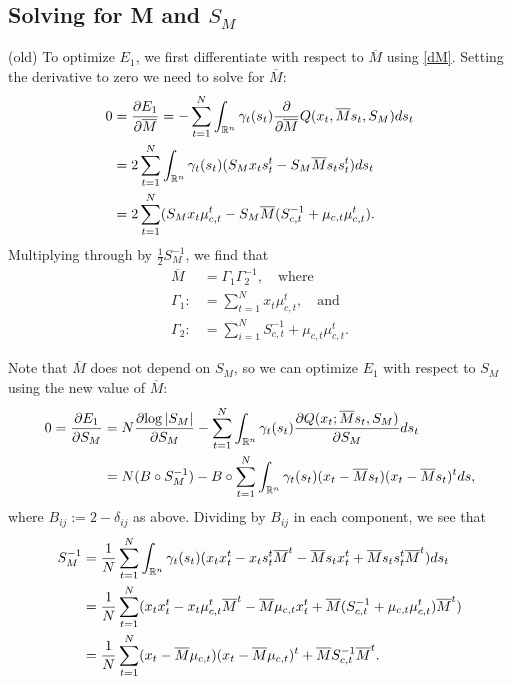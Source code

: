 \documentclass[12pt,leqno]{article}
\begin{document}
\subsection{Solving for M and $S_M$} (old)
To optimize $E_1$, we first differentiate with respect to $\overline{M}$ using \eqref{dM}.
Setting the derivative to zero we need to solve for $\overline{M}$:
\begin{align*}
  0 &= \frac{\partial{E_1}}{\partial\overline{M}}
  = -\sum_{t=1}^N\int_{{\mathbb R}^n}\gamma_t(s_t)\frac{\partial}{\partial\overline{M}}Q(x_t,\overline{M}s_t,S_M)ds_t\\
  &= 2\sum_{t=1}^N\int_{{\mathbb R}^n}\gamma_t(s_t)(S_Mx_ts_t^t - S_M\overline{M}s_ts_t^t)ds_t\\
  &= 2\sum_{t=1}^N(S_Mx_t\mu_{c,t}^t - S_M\overline{M}(S_{c,t}^{-1} + \mu_{c,t}\mu_{c,t}^t).
\end{align*}
Multiplying through by $\frac{1}{2}S_M^{-1}$, we find that
\begin{equation}\label{M_bar}
  \begin{split}
    \overline{M} &= \Gamma_1\Gamma_2^{-1}, \quad\text{where}\\
    \Gamma_1 :&= \sum_{t=1}^Nx_t\mu_{c,t}^t, \quad\text{and}\\
    \Gamma_2 :&= \sum_{i=1}^NS_{c,t}^{-1} + \mu_{c,t}\mu_{c,t}^t.
  \end{split}
\end{equation}

Note that $\overline{M}$ does not depend on $S_M$, so we can optimize $E_1$ with respect to $S_M$
using the new value of $\overline{M}$:
\begin{align*}
  0 = \frac{\partial{E_1}}{\partial{S_M}} &=
   N\frac{\partial{\log|S_M|}}{\partial{S_M}}
  - \sum_{t=1}^N\int_{{\mathbb R}^n}\gamma_t(s_t)\frac{\partial{Q(x_t;\overline{M}s_t,S_M)}}{\partial{S_M}}ds_t \\
  &= N(B\circ{S}_M^{-1}) - B\circ\sum_{t=1}^N
  \int_{{\mathbb R}^n}\gamma_t(s_t)(x_t-\overline{M}s_t)(x_t-\overline{M}s_t)^tds,
\end{align*}
where $B_{ij} := 2-\delta_{ij}$ as above.  Dividing by $B_{ij}$ in each component, we see that
\begin{equation}\label{S_x}
  \begin{split}
    S_M^{-1} &= \frac{1}{N}\sum_{t=1}^N\int_{{\mathbb R}^n}\gamma_t(s_t)(x_tx_t^t - x_ts_t^t\overline{M}^t
    - \overline{M}s_tx_t^t + \overline{M}s_ts_t^t\overline{M}^t)ds_t \\
    &= \frac{1}{N}\sum_{t=1}^N(x_tx_t^t - x_t\mu_{c,t}^t\overline{M}^t - \overline{M}\mu_{c,t}x_t^t +
    \overline{M}(S_{c,t}^{-1}+\mu_{c,t}\mu_{c,t}^t)\overline{M}^t)\\
    &= \frac{1}{N}\sum_{t=1}^N(x_t-\overline{M}\mu_{c,t})(x_t-\overline{M}\mu_{c,t})^t +
    \overline{M}S_{c,t}^{-1}\overline{M}^t.
  \end{split}
\end{equation}
\end{document}
